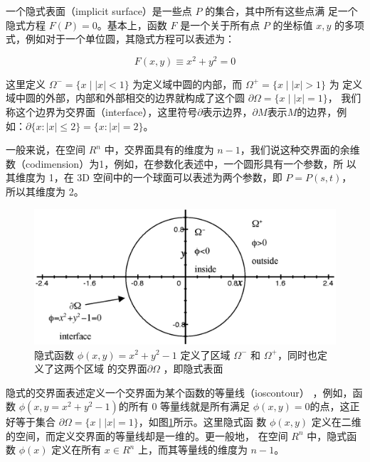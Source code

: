 一个隐式表面（implicit surface）是一些点 $P$ 的集合，其中所有这些点满 足一个隐式方程 $F(P) = 0$。基本上，函数 $F$ 是一个关于所有点 $P$ 的坐标值 $x,y$ 的多项式，例如对于一个单位圆，其隐式方程可以表述为：

\begin{equation}
	F(x,y)\equiv x^{2}+y^{2}=0
\end{equation}

这里定义 $\Omega^{−} = \{{x}\mid|{x}| < 1\}$ 为定义域中圆的内部，而 $\Omega^{+} = \{{x}\mid|{x}| > 1\}$ 为 定义域中圆的外部，内部和外部相交的边界就构成了这个圆 $\partial\Omega= \{{x}\mid|{x}| = 1\}$， 我们称这个边界为交界面（interface），这里符号$\partial$表示边界，$\partial M$表示$M$的边界，例如：$\partial\{x:|x|\leq 2\}=\{x:|x|=2\}$。

一般来说，在空间 $R^{n}$ 中，交界面具有的维度为 $n−1$，我们说这种交界面的余维数（codimension）为1，例如，在参数化表述中，一个圆形具有一个参数，所 以其维度为 1，在 3D 空间中的一个球面可以表述为两个参数，即 $P = P (s, t)$， 所以其维度为 2。

\begin{figure}
	\includegraphics[width=\textwidth]{figures/df/implicit-function}
	\caption{隐式函数 $\phi(x, y) = x^{2} + y^{2} − 1$ 定义了区域 $\Omega^{−}$ 和 $\Omega^{+}$，同时也定义了这两个区域 的交界面$\partial\Omega$ ，即隐式表面}
	\label{f:df-implicit-function}
\end{figure}

隐式的交界面表述定义一个交界面为某个函数的等量线（ioscontour） ，例如，函数 $\phi(x,y=x^{2}+y^{2}-1) $的所有 0 等量线就是所有满足 $\phi(x,y) = 0$的点，这正好等于集合 $\partial\Omega = \{{x}\mid |{x}| = 1\}$，如图\ref{f:df-implicit-function}所示。这里隐式函 数 $\phi(x,y)$ 定义在二维的空间，而定义交界面的等量线却是一维的。更一般地， 在空间 $R^{n}$ 中，隐式函数 $\phi({x})$ 定义在所有 ${x} \in R^{n}$ 上，而其等量线的维度为 $n − 1$。

